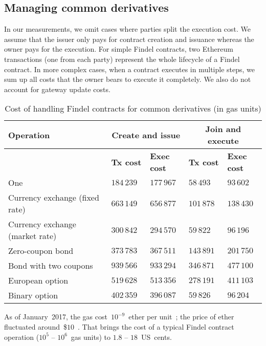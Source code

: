 \subsection{Managing common derivatives}

In our measurements, we omit cases where parties split the execution cost.
We assume that the issuer only pays for contract creation and issuance whereas the owner pays for the execution.
For simple Findel contracts, two Ethereum transactions (one from each party) represent the whole lifecycle of a Findel contract.
In more complex cases, when a contract executes in multiple steps, we sum up all costs that the owner bears to execute it completely.
We also do not account for gateway update costs.

\begin{table}
	\centering
	\begin{tabular}{|p{0.4\linewidth}|p{0.15\linewidth}|p{0.15\linewidth}|p{0.15\linewidth}|p{0.15\linewidth}|}
		\hline
		\textbf{Operation} & \multicolumn{2}{|c|}{\textbf{Create and issue}} & \multicolumn{2}{|c|}{\textbf{Join and execute}}\\
		\hline
		& \textbf{Tx cost} & \textbf{Exec cost} & \textbf{Tx cost} & \textbf{Exec cost} \\
		\hline
		One & $184\,239$ & $177\,967$ & $58\,493$ & $93\,602$ \\
		\hline
		Currency exchange (fixed rate) & $663\,149$ & $656\,877$ & $101\,878$ & $138\,430$ \\
		\hline
		Currency exchange (market rate) & $300\,842$ & $294\,570$ & $59\,822$ & $96\,196$ \\
		\hline
		Zero-coupon bond & $373\,783$ & $367\,511$ & $143\,891$ & $201\,750$ \\
		\hline
		Bond with two coupons & $939\,566$ & $933\,294$ & $346\,871$ & $477\,100$ \\
		\hline
		European option & $519\,628$ & $513\,356$ & $278\,191$ & $411\,103$ \\
		\hline
		Binary option & $402\,359$ & $396\,087$ & $59\,826$ & $96\,204$ \\
		\hline
	\end{tabular}
	\caption{Cost of handling Findel contracts for common derivatives (in gas units)}
	\label{tab:Ch10FindelCost2}
\end{table}

As of January~2017, the gas cost~$10^{-9}$~ether per unit~\cite{Ethstats}; the price of ether fluctuated around~\$$10$~\cite{Worldcoinindex}.
That brings the cost of a typical Findel contract operation ($10^5$ -- $10^6$~gas units) to $1.8$ -- $18$~US~cents.


